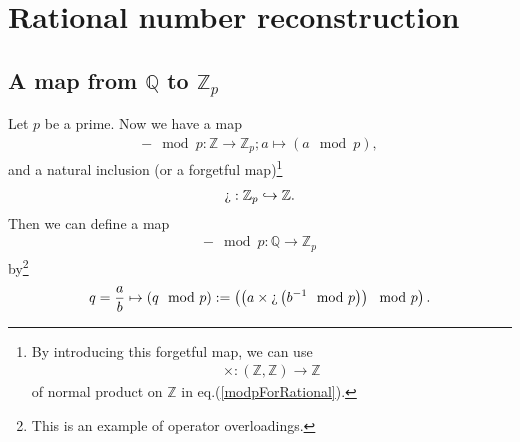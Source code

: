 \documentclass[11pt]{book}
\begin{document}
\section{Rational number reconstruction}
\subsection{A map from $\mathbb{Q}$ to $\mathbb{Z}_p$}
Let $p$ be a prime.
Now we have a map
\begin{eqnarray}
- \mod p : \mathbb{Z} \to \mathbb{Z}_p; a \mapsto (a \mod p),
\end{eqnarray}
and a natural inclusion (or a forgetful map)\footnote{
By introducing this forgetful map, we can use 
\begin{eqnarray}
\times : (\mathbb{Z}, \mathbb{Z}) \to \mathbb{Z} 
\end{eqnarray}
of normal product on $\mathbb{Z}$ in eq.(\ref{modpForRational}).
}
\begin{eqnarray}
\text{\textquestiondown} : \mathbb{Z}_p \hookrightarrow \mathbb{Z}.
\end{eqnarray}
Then we can define a map
\begin{eqnarray}
- \mod p : \mathbb{Q} \to \mathbb{Z}_p
\end{eqnarray}
by\footnote{
This is an example of operator overloadings.
}
\begin{eqnarray}
\label{modpForRational}
q = \frac{a}{b} \mapsto (q \mod p) := \left( \left( a \times \text{\textquestiondown} \left( b^{-1} \mod p\right) \right) \mod p \right).
\end{eqnarray}
\end{document}
